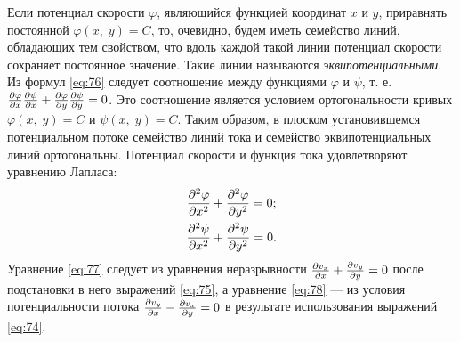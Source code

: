 	Если потенциал скорости $\varphi$, являющийся функцией координат $x$ и $y$, приравнять постоянной $\varphi\left(x,\; y\right) = C$, то, очевидно, будем иметь семейство линий, обладающих тем свойством, что вдоль каждой такой линии потенциал скорости сохраняет постоянное значение. Такие линии называются \textit{эквипотенциальными}.\n
	Из формул \eqref{eq:76} следует соотношение между функциями $\varphi$ и $\psi$, т. е. $\frac{\partial\varphi}{\partial x}\frac{\partial\psi}{\partial x} + \frac{\partial\varphi}{\partial y}\frac{\partial\psi}{\partial y} = 0$. Это соотношение является условием ортогональности кривых $\varphi\left(x,\; y\right) = C$ и $\psi\left(x,\; y\right) = C$. Таким образом, в плоском установившемся потенциальном потоке семейство линий тока и семейство эквипотенциальных линий ортогональны.\n
	Потенциал скорости и функция тока удовлетворяют уравнению Лапласа:
	\begin{gather}
		\frac{\partial^2\varphi}{\partial x^2} + \frac{\partial^2\varphi}{\partial y^2} = 0;\label{eq:77}\\
		\frac{\partial^2\psi}{\partial x^2} + \frac{\partial^2\psi}{\partial y^2} = 0.\label{eq:78}
	\end{gather}\n
	Уравнение \eqref{eq:77} следует из уравнения неразрывности $\frac{\partial v_x}{\partial x} + \frac{\partial v_y}{\partial y} = 0$ после подстановки в него выражений \eqref{eq:75}, а уравнение \eqref{eq:78} --- из условия потенциальности потока $\frac{\partial v_y}{\partial x} - \frac{\partial v_x}{\partial y} = 0$ в результате использования выражений \eqref{eq:74}.
	
